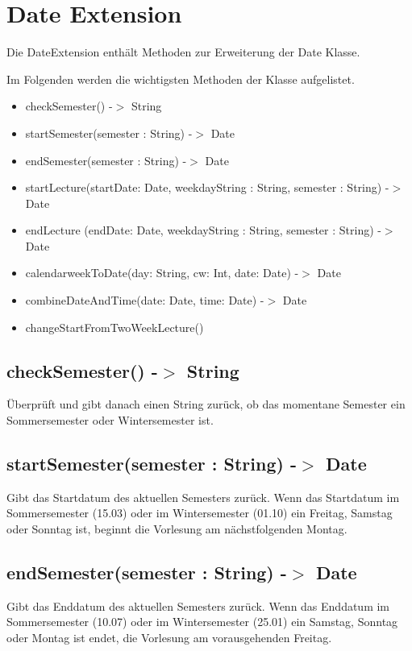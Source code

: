 \chapter{Date Extension}
Die DateExtension enthält Methoden zur Erweiterung der Date Klasse.

Im Folgenden werden die wichtigsten Methoden der Klasse aufgelistet.
\begin{itemize}
     \item checkSemester() -$>$ String
     \item startSemester(semester : String) -$>$ Date
     \item endSemester(semester : String) -$>$ Date
     \item startLecture(startDate: Date, weekdayString : String, semester : String) -$>$ Date
     \item endLecture (endDate: Date, weekdayString : String, semester : String) -$>$ Date
     \item calendarweekToDate(day: String, cw: Int, date: Date) -$>$ Date   
     \item combineDateAndTime(date: Date, time: Date) -$>$ Date
     \item changeStartFromTwoWeekLecture()
\end{itemize}
\newpage

\section{checkSemester() -$>$ String}
Überprüft und gibt danach einen String zurück, ob das momentane Semester ein Sommersemester oder Wintersemester ist. 

\section{startSemester(semester : String) -$>$ Date}
Gibt das Startdatum des aktuellen Semesters zurück. Wenn das Startdatum im Sommersemester (15.03) oder im Wintersemester (01.10) ein Freitag, Samstag oder Sonntag ist, beginnt die Vorlesung am nächstfolgenden Montag.

\section{endSemester(semester : String) -$>$ Date}
Gibt das Enddatum des aktuellen Semesters zurück. Wenn das Enddatum im Sommersemester (10.07) oder im Wintersemester (25.01) ein Samstag, Sonntag oder Montag ist endet, die Vorlesung am vorausgehenden Freitag.

